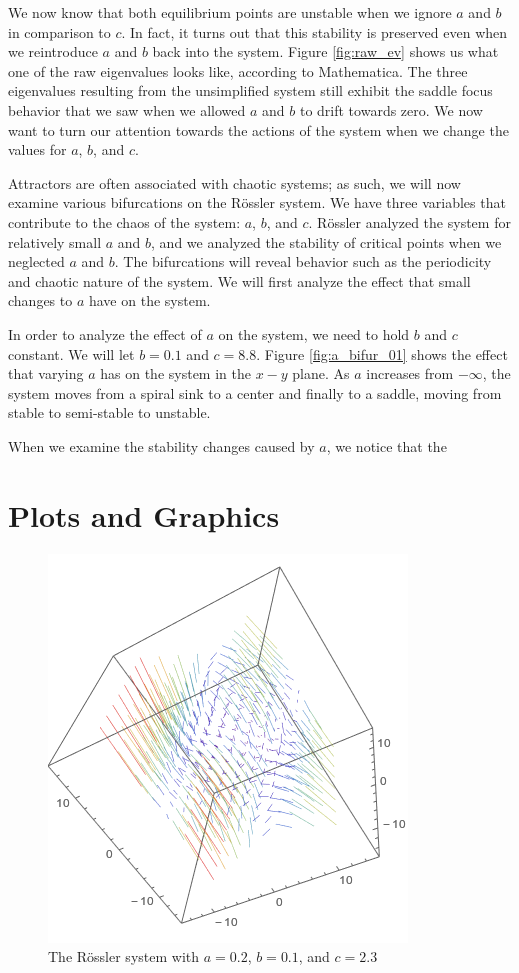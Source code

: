 \documentclass{article}
\begin{document}
We now know that both equilibrium points are unstable when we ignore $a$ and $b$ in comparison to $c$. In fact, it turns out that this stability is preserved even when we reintroduce $a$ and $b$ back into the system. Figure \ref{fig:raw_ev} shows us what one of the raw eigenvalues looks like, according to Mathematica. The three eigenvalues resulting from the unsimplified system still exhibit the saddle focus behavior that we saw when we allowed $a$ and $b$ to drift towards zero. We now want to turn our attention towards the actions of the system when we change the values for $a$, $b$, and $c$.

Attractors are often associated with chaotic systems; as such, we will now examine various bifurcations on the R\"{o}ssler system. We have three variables that contribute to the chaos of the system: $a$, $b$, and $c$. R\"{o}ssler analyzed the system for relatively small $a$ and $b$, and we analyzed the stability of critical points when we neglected $a$ and $b$. The bifurcations will reveal behavior such as the periodicity and chaotic nature of the system. We will first analyze the effect that small changes to $a$ have on the system.

In order to analyze the effect of $a$ on the system, we need to hold $b$ and $c$ constant. We will let $b=0.1$ and $c=8.8$. Figure \ref{fig:a_bifur_01} shows the effect that varying $a$ has on the system in the $x-y$ plane. As $a$ increases from $-\infty$, the system moves from a spiral sink to a center and finally to a saddle, moving from stable to semi-stable to unstable.

When we examine the stability changes caused by $a$, we notice that the 

\newpage
\clearpage
\section*{Plots and Graphics}
\begin{figure}[h]
	\centering
	\includegraphics[scale=0.5]{vp_01.png}
	\caption{The R\"{o}ssler system with $a=0.2$, $b=0.1$, and $c=2.3$}
	\label{fig:3dsys_01}
\end{figure}
\end{document}

